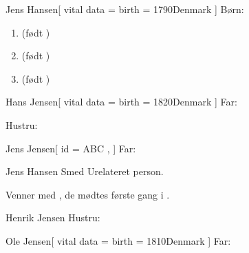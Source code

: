 \documentclass[
	twocolumn
]{article}
\begin{document}
\begin{gprProfile}{Jens Hansen}[
	vital data = {
		birth = {1790}{Denmark}
	}
]
	Børn:
	\begin{enumerate}
	\item {} (født )
	\item {} (født )
	\item {} (født )
	\end{enumerate}

\end{gprProfile}

\begin{gprProfile}{Hans Jensen}[
	vital data = {
		birth = {1820}{Denmark}
	}
]
	Far:

	Hustru:

\end{gprProfile}

\begin{gprProfile}{Jens Jensen}[
	id = {ABC} ,
]
	Far:

\end{gprProfile}

\begin{gprProfile}{Jens Hansen Smed}
	Urelateret person.
	
	Venner med , de mødtes første gang i .

\end{gprProfile}

\begin{gprProfile}{Henrik Jensen}
	Hustru:
	
	\lipsum[1-2]

\end{gprProfile}



\begin{gprProfile}{Ole Jensen}[
	vital data = {
		birth = {1810}{Denmark}
	}
]
	Far:
\end{gprProfile}

\gprCheckReferences{}
\end{document}
